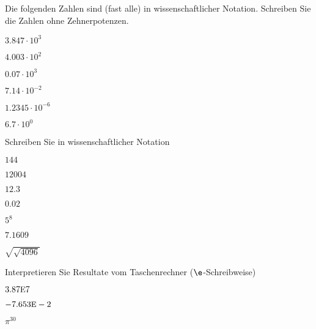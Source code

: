 \platzFuerBerechnungenBisEndeSeite{}
\TRAINER{\newpage}

Die folgenden Zahlen sind (fast alle) in wissenschaftlicher Notation. Schreiben
Sie die Zahlen ohne Zehnerpotenzen.

\begin{bbwAufgabenBlock}
\item $3.847 \cdot{} 10^3$ 
\item $4.003\cdot{} 10^2$ 
\item $0.07\cdot{}10^3$ 
\item $7.14\cdot{}10^{-2}$
\item $1.2345\cdot{}10^{-6}$ 
\item $6.7\cdot{}10^0$ 
\end{bbwAufgabenBlock}

\platzFuerBerechnungenBisEndeSeite{}


Schreiben Sie in wissenschaftlicher Notation

\begin{bbwAufgabenBlock}
\item $144$ 
\item $12004$ 
\item $12.3$ 
\item $0.02$ 
\item $5^8$ 
\item $7.1609$ 
\item $\sqrt{\sqrt{4096}}$ 
\end{bbwAufgabenBlock}

\platzFuerBerechnungenBisEndeSeite{}

Interpretieren Sie Resultate vom Taschenrechner ($\e$-Schreibweise)

\begin{bbwAufgabenBlock}
\item $3.87\text{\small{E}}7$ 
\item $-7.653\text{\small{E}}-2$ 
\item $\pi^{30}$ 
\end{bbwAufgabenBlock}


